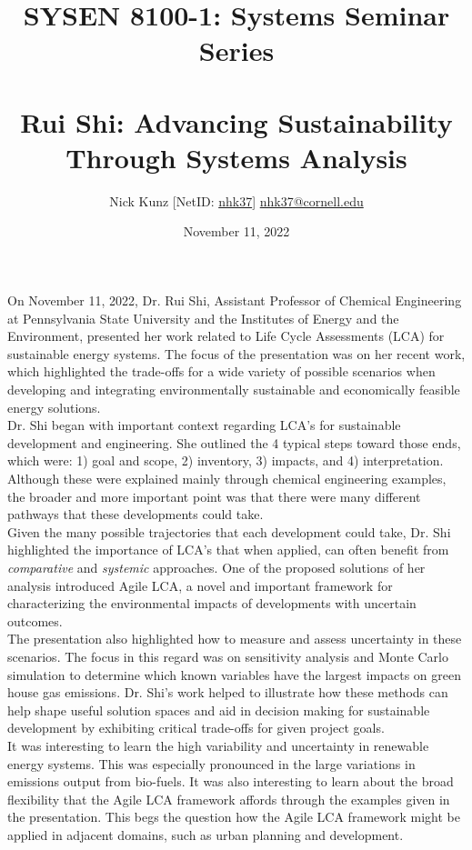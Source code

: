 \documentclass[11pt]{article}
\begin{document}
\title{SYSEN 8100-1: Systems Seminar Series\\~\\
    \Large Rui Shi: Advancing Sustainability Through Systems Analysis
}
\author{
    Nick Kunz [NetID: \url{nhk37}] \hyperlink{nhk37@cornell.edu}{nhk37@cornell.edu}
}
\date{November 11, 2022}
\maketitle

On November 11, 2022, Dr. Rui Shi, Assistant Professor of Chemical Engineering at Pennsylvania State University and the Institutes of Energy and the Environment, presented her work related to Life Cycle Assessments (LCA) for sustainable energy systems. The focus of the presentation was on her recent work, which highlighted the trade-offs for a wide variety of possible scenarios when developing and integrating environmentally sustainable and economically feasible energy solutions.\\

Dr. Shi began with important context regarding LCA's for sustainable development and engineering. She outlined the 4 typical steps toward those ends, which were: 1) goal and scope, 2) inventory, 3) impacts, and 4) interpretation. Although these were explained mainly through chemical engineering examples, the broader and more important point was that there were many different pathways that these developments could take.\\

Given the many possible trajectories that each development could take, Dr. Shi highlighted the importance of LCA's that when applied, can often benefit from \textit{comparative} and \textit{systemic} approaches. One of the proposed solutions of her analysis introduced Agile LCA, a novel and important framework for characterizing the environmental impacts of developments with uncertain outcomes. \\

The presentation also highlighted how to measure and assess uncertainty in these scenarios. The focus in this regard was on sensitivity analysis and Monte Carlo simulation to determine which known variables have the largest impacts on green house gas emissions. Dr. Shi's work helped to illustrate how these methods can help shape useful solution spaces and aid in decision making for sustainable development by exhibiting critical trade-offs for given project goals.\\

It was interesting to learn the high variability and uncertainty in renewable energy systems. This was especially pronounced in the large variations in emissions output from bio-fuels. It was also interesting to learn about the broad flexibility that the Agile LCA framework affords through the examples given in the presentation. This begs the question how the Agile LCA framework might be applied in adjacent domains, such as urban planning and development.\\
\end{document}
